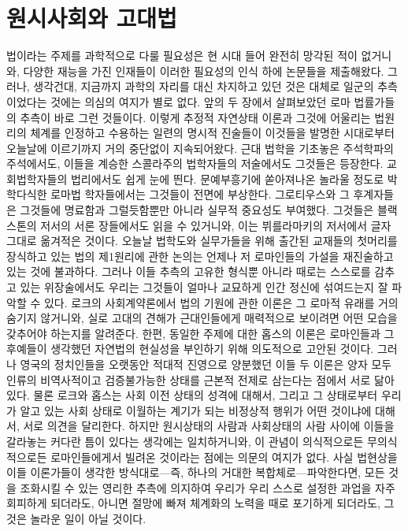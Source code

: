 \chapter{원시사회와 고대법}

법이라는 주제를 과학적으로 다룰 필요성은 현 시대 들어
완전히 망각된 적이 없거니와,
다양한 재능을 가진 인재들이
이러한 필요성의 인식 하에 논문들을 제출해왔다.
그러나, 생각건대,
지금까지 과학의 자리를 대신 차지하고 있던 것은
대체로 일군의 추측이었다는 것에는 의심의 여지가 별로 없다.
앞의 두 장에서 살펴보았던 로마 법률가들의 추측이 바로 그런 것들이다.
이렇게 추정적 자연상태 이론과
그것에 어울리는 법원리의 체계를 인정하고 수용하는 일련의 명시적 진술들이
이것들을 발명한 시대로부터 오늘날에 이르기까지 거의 중단없이 지속되어왔다.
근대 법학을 기초놓은 주석학파의 주석에서도,
이들을 계승한 스콜라주의 법학자들의 저술에서도 그것들은 등장한다.
교회법학자들의 법리에서도 쉽게 눈에 띈다.
문예부흥기에 쏟아져나온 놀라울 정도로 박학다식한
로마법 학자들에서는
그것들이 전면에 부상한다.
그로티우스와 그 후계자들은 그것들에 명료함과 그럴듯함뿐만 아니라
실무적 중요성도 부여했다.
그것들은 블랙스톤의 저서의 서론 장들에서도 읽을 수 있거니와,
이는 뷔를라마키의 저서에서
글자 그대로 옮겨적은 것이다.
오늘날 법학도와 실무가들을 위해 출간된 교재들의 첫머리를 장식하고 있는
법의 제1원리에 관한 논의는 언제나 저 로마인들의 가설을
재진술하고 있는 것에 불과하다.
그러나 이들 추측의 고유한 형식뿐 아니라
때로는 스스로를 감추고 있는 위장술에서도
우리는 그것들이 얼마나 교묘하게 인간 정신에 섞여드는지 잘 파악할 수 있다.
로크의 사회계약론에서 법의 기원에 관한 이론은
그 로마적 유래를 거의 숨기지 않거니와,
실로 고대의 견해가 근대인들에게 매력적으로 보이려면
어떤 모습을 갖추어야 하는지를 알려준다.
한편, 동일한 주제에 대한 홉스의 이론은
로마인들과 그 후예들이 생각했던 자연법의 현실성을
부인하기 위해 의도적으로 고안된 것이다.
그러나 영국의 정치인들을 오랫동안 적대적 진영으로 양분했던
이들 두 이론은 양자 모두 인류의 비역사적이고 검증불가능한 상태를
근본적 전제로 삼는다는 점에서 서로 닮아있다.
물론 로크와 홉스는 사회 이전 상태의 성격에 대해서, 그리고
그 상태로부터 우리가 알고 있는 사회 상태로 이월하는 계기가 되는
비정상적 행위가 어떤 것이냐에 대해서, 서로 의견을 달리한다.
하지만 원시상태의 사람과 사회상태의 사람 사이에
이들을 갈라놓는 커다란 틈이 있다는 생각에는 일치하거니와,
이 관념이 의식적으로든 무의식적으로든
로마인들에게서 빌려온 것이라는 점에는 의문의 여지가 없다.
사실 법현상을 이들 이론가들이 생각한 방식대로---즉, 하나의 거대한
복합체로---파악한다면, 
모든 것을 조화시킬 수 있는 영리한 추측에 의지하여
우리가 우리 스스로 설정한 과업을 자주 회피하게 되더라도,
아니면 절망에 빠져 체계화의 노력을 때로 포기하게 되더라도,
그것은 놀라운 일이 아닐 것이다.

